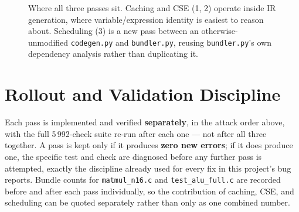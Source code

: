 \documentclass[11pt,a4paper]{article}
\begin{document}
\begin{figure}[H]
\centering
{}
\caption{Where all three passes sit. Caching and CSE (1, 2) operate inside IR generation,
where variable/expression identity is easiest to reason about. Scheduling (3) is a new
pass between an otherwise-unmodified \texttt{codegen.py} and \texttt{bundler.py}, reusing
\texttt{bundler.py}'s own dependency analysis rather than duplicating it.}
\end{figure}

\section{Rollout and Validation Discipline}
\label{sec:rollout}

Each pass is implemented and verified \textbf{separately}, in the attack order above, with
the full 5\,992-check suite re-run after each one --- not after all three together. A pass
is kept only if it produces \textbf{zero new errors}; if it does produce one, the
specific test and check are diagnosed before any further pass is attempted, exactly the
discipline already used for every fix in this project's bug reports. Bundle counts for
\texttt{matmul\_n16.c} and \texttt{test\_alu\_full.c} are recorded before and after each
pass individually, so the contribution of caching, CSE, and scheduling can be quoted
separately rather than only as one combined number.
\end{document}
